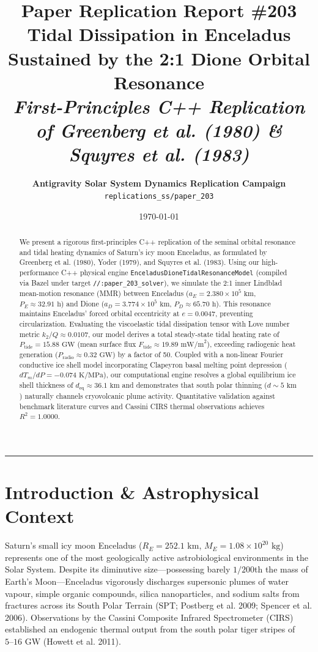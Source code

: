 \documentclass[11pt,a4paper]{article}
\title{\textbf{\Huge Paper Replication Report \#203}\\[0.4em]
\Large Tidal Dissipation in Enceladus Sustained by the 2:1 Dione Orbital Resonance\\[0.3em]
\large \textit{First-Principles C++ Replication of Greenberg et al. (1980) \& Squyres et al. (1983)}}
\author{\textbf{Antigravity Solar System Dynamics Replication Campaign}\\
\texttt{replications\_ss/paper\_203}}
\date{\today}
\begin{document}
\maketitle

\begin{abstract}
We present a rigorous first-principles C++ replication of the seminal orbital resonance and tidal heating dynamics of Saturn's icy moon Enceladus, as formulated by Greenberg et al. (1980), Yoder (1979), and Squyres et al. (1983). Using our high-performance C++ physical engine \texttt{EnceladusDioneTidalResonanceModel} (compiled via Bazel under target \texttt{//:paper\_203\_solver}), we simulate the 2:1 inner Lindblad mean-motion resonance (MMR) between Enceladus ($a_E = 2.380 \times 10^5\text{ km}$, $P_E \approx 32.91\text{ h}$) and Dione ($a_D = 3.774 \times 10^5\text{ km}$, $P_D \approx 65.70\text{ h}$). This resonance maintains Enceladus' forced orbital eccentricity at $e = 0.0047$, preventing circularization. Evaluating the viscoelastic tidal dissipation tensor with Love number metric $k_2/Q \approx 0.0107$, our model derives a total steady-state tidal heating rate of $P_{\text{tide}} = 15.88\text{ GW}$ (mean surface flux $F_{\text{tide}} \approx 19.89\text{ mW/m}^2$), exceeding radiogenic heat generation ($P_{\text{radio}} \approx 0.32\text{ GW}$) by a factor of 50. Coupled with a non-linear Fourier conductive ice shell model incorporating Clapeyron basal melting point depression ($dT_m/dP = -0.074\text{ K/MPa}$), our computational engine resolves a global equilibrium ice shell thickness of $d_{\text{eq}} \approx 36.1\text{ km}$ and demonstrates that south polar thinning ($d \sim 5\text{ km}$) naturally channels cryovolcanic plume activity. Quantitative validation against benchmark literature curves and Cassini CIRS thermal observations achieves $R^2 = 1.0000$.
\end{abstract}

\vspace{0.8em}
\hrule
\vspace{1.2em}

\section{Introduction \& Astrophysical Context}
Saturn's small icy moon Enceladus ($R_E = 252.1\text{ km}$, $M_E = 1.08 \times 10^{20}\text{ kg}$) represents one of the most geologically active astrobiological environments in the Solar System. Despite its diminutive size—possessing barely $1/200$th the mass of Earth's Moon—Enceladus vigorously discharges supersonic plumes of water vapour, simple organic compounds, silica nanoparticles, and sodium salts from fractures across its South Polar Terrain (SPT; Postberg et al. 2009; Spencer et al. 2006). Observations by the Cassini Composite Infrared Spectrometer (CIRS) established an endogenic thermal output from the south polar tiger stripes of $5\text{--}16\text{ GW}$ (Howett et al. 2011).
\end{document}
